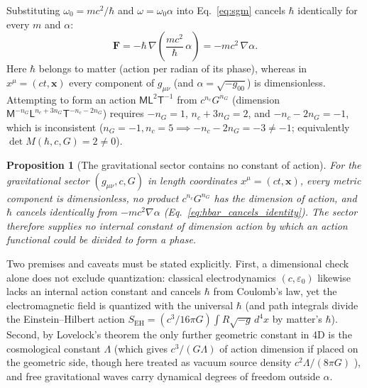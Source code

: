 \documentclass[aps,prd,onecolumn,tightenlines,nofootinbib,notitlepage,10pt,floatfix]{revtex4-2}
\theoremstyle{indentedtheorem}
\newtheorem{proposition}{Proposition}
\begin{document}
Substituting $\omega_0=mc^2/\hbar$ and $\omega=\omega_0\alpha$ into Eq.~\eqref{eq:sgm} cancels $\hbar$ identically for every $m$ and $\alpha$:
\begin{equation}
    \mathbf{F} = -\hbar\,\nabla\!\left(\frac{mc^2}{\hbar}\,\alpha\right) = -mc^2\,\nabla\alpha .
    \label{eq:hbar_cancels_identity}
\end{equation}
Here $\hbar$ belongs to matter (action per radian of its phase), whereas in $x^\mu=(ct,\mathbf{x})$ every component of $g_{\mu\nu}$ (and $\alpha=\sqrt{-g_{00}}$) is dimensionless. Attempting to form an action $\mathsf{M}\mathsf{L}^2\mathsf{T}^{-1}$ from $c^{n_c}G^{n_G}$ (dimension $\mathsf{M}^{-n_G}\mathsf{L}^{n_c+3n_G}\mathsf{T}^{-n_c-2n_G}$) requires $-n_G=1$, $n_c+3n_G=2$, and $-n_c-2n_G=-1$, which is inconsistent ($n_G=-1, n_c=5\implies -n_c-2n_G=-3\neq -1$; equivalently $\det M(\hbar,c,G)=2\neq 0$).

\begin{proposition}[The gravitational sector contains no constant of action]\label{prop:no_grav_action}
For the gravitational sector $(g_{\mu\nu},c,G)$ in length coordinates $x^\mu=(ct,\mathbf{x})$, every metric component is dimensionless, no product $c^{n_c}G^{n_G}$ has the dimension of action, and $\hbar$ cancels identically from $-mc^2\nabla\alpha$ (Eq.~\eqref{eq:hbar_cancels_identity}). The sector therefore supplies no internal constant of dimension action by which an action functional could be divided to form a phase.
\end{proposition}

\noindent Two premises and caveats must be stated explicitly. First, a dimensional check alone does not exclude quantization: classical electrodynamics $(c,\varepsilon_0)$ likewise lacks an internal action constant and cancels $\hbar$ from Coulomb's law, yet the electromagnetic field is quantized with the universal $\hbar$ (and path integrals divide the Einstein--Hilbert action $S_\text{EH}=(c^3/16\pi G)\int R\sqrt{-g}\,d^4x$ by matter's $\hbar$). Second, by Lovelock's theorem \citep{Lovelock1972Four} the only further geometric constant in 4D is the cosmological constant $\Lambda$ (which gives $c^3/(G\Lambda)$ of action dimension if placed on the geometric side, though here treated as vacuum source density $c^2\Lambda/(8\pi G)$ \citep{Carroll2001Cosmological}), and free gravitational waves carry dynamical degrees of freedom outside $\alpha$.
\end{document}

